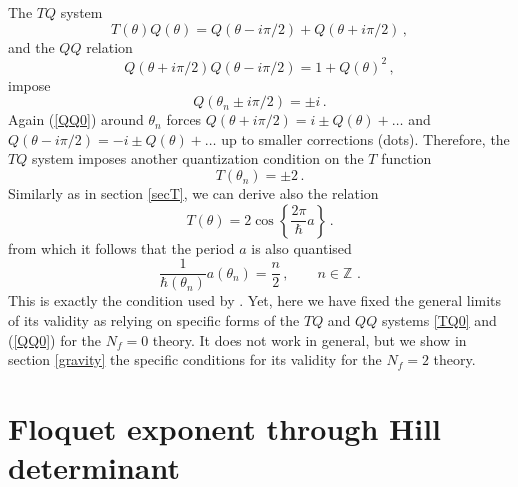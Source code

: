 \documentclass[11pt,a4paper]{elsarticle}
\def \th {\theta}
\newcommand{\be}{\begin{equation}}
\newcommand{\ee}{\end{equation}}
\def\th{\theta}
\numberwithin{figure}{section}
\numberwithin{table}{section}
\begin{document}
The $TQ$ system
\begin{equation}
T(\theta)Q(\theta) = Q(\theta - i \pi /2) +Q(\theta + i \pi /2) \,, \label{TQ0}
\end{equation} 
and the $QQ$ relation 
\begin{equation} 
 Q(\theta + i \pi/2) Q(\theta -i \pi/2)= 1+ Q(\theta)^2  \, , \label{QQ0}
\end{equation}
impose
\be \label{quantQ0}
Q(\th_n \pm i \pi/2) = \pm i \,.
\ee
Again (\ref{QQ0}) around $\th_n$ forces $Q(\th + i \pi/2) =  i \pm   Q(\th)+\dots$ and $Q(\th - i \pi/2) =   - i \pm Q(\th)+\dots$ up to smaller corrections (dots). Therefore, the $TQ$ system imposes another quantization condition on the $T$ function 
\be \label{quantT0}
T(\th_n) =\pm 2\,.
\ee 
Similarly as in section \ref{secT}, we can derive also the relation
\be  \label{Tnua}
T(\th) = 2 \cos \left\{\frac{2 \pi }{\hbar}a \right\} \, .
\ee 
from which it follows that the period $a$ is also quantised%
\be  \label{QuantA0}
\frac{1}{\hbar(\theta_n)}a(\th_n) = \frac{n}{2} \,, \qquad n \in \mathbb{Z}\,\,.
\ee 
This is exactly the condition used by \cite{BianchiConsoliGrilloMorales:2021}. Yet, here we have fixed the general limits of its validity as relying on specific forms of the $TQ$ and $QQ$ systems \eqref{TQ0} and (\ref{QQ0}) for the $N_f=0$ theory. It does not work in general, but we show in section \ref{gravity} the specific conditions for its validity for the $N_f=2$ theory.


\section{Floquet exponent through Hill determinant} \label{appHill}
\end{document}
